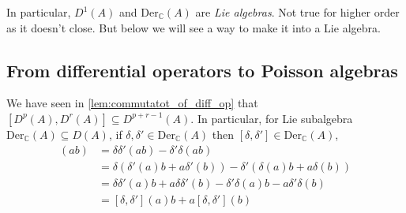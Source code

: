 \label{lem:commutatot_of_diff_op}
In particular, $D^1(A)$ and $\mathrm{Der}_\mathbb{C}(A)$ are \textit{Lie algebras}. Not true for higher order as it doesn't close. But below we will see a way to make it into a Lie algebra.

\subsection{From differential operators to Poisson algebras} %
\label{sub:from_differential_operators_to_poisson_algebras}
We have seen in \cref{lem:commutatot_of_diff_op} that $\left[D^p(A), D^r(A)\right]\subseteq D^{p+r-1}(A)$. 
In particular, for Lie subalgebra $\mathrm{Der}_\mathbb{C}(A) \subseteq D(A)$, if $\delta,\delta' \in \mathrm{Der}_\mathbb{C}(A)$ then $\left[\delta,\delta'\right] \in \mathrm{Der}_\mathbb{C}(A)$,
\begin{align*}
    [\delta, \delta'](ab) &= \delta \delta'(ab) - \delta' \delta(ab)\\
    &=\delta (\delta'(a) b + a \delta'(b)) - \delta'( \delta(a)b + a\delta(b))\\
    &= \delta \delta'(a)b + a \delta \delta'(b) - \delta' \delta(a) b - a \delta' \delta(b)\\
    &= [\delta, \delta'](a)b + a [\delta,\delta'](b)
\end{align*}
\label{def:grading}

